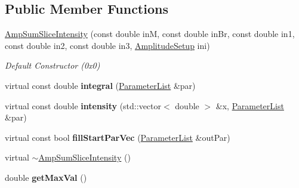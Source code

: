 \subsection*{Public Member Functions}
\begin{DoxyCompactItemize}
\item 
\hypertarget{class_amp_sum_slice_intensity_a84184310702a57fe213ef21d341f5c4e}{\hyperlink{class_amp_sum_slice_intensity_a84184310702a57fe213ef21d341f5c4e}{Amp\-Sum\-Slice\-Intensity} (const double in\-M, const double in\-Br, const double in1, const double in2, const double in3, \hyperlink{class_amplitude_setup}{Amplitude\-Setup} ini)}\label{class_amp_sum_slice_intensity_a84184310702a57fe213ef21d341f5c4e}

\begin{DoxyCompactList}\small\item\em Default Constructor (0x0) \end{DoxyCompactList}\item 
\hypertarget{class_amp_sum_slice_intensity_aeef9bdb403caa91ca4bf8615627ca6fc}{virtual const double {\bfseries integral} (\hyperlink{class_parameter_list}{Parameter\-List} \&par)}\label{class_amp_sum_slice_intensity_aeef9bdb403caa91ca4bf8615627ca6fc}

\item 
\hypertarget{class_amp_sum_slice_intensity_a845d93e9216f2af4057715ce879d3989}{virtual const double {\bfseries intensity} (std\-::vector$<$ double $>$ \&x, \hyperlink{class_parameter_list}{Parameter\-List} \&par)}\label{class_amp_sum_slice_intensity_a845d93e9216f2af4057715ce879d3989}

\item 
\hypertarget{class_amp_sum_slice_intensity_ac9eda7d89099198806b0acd365acf884}{virtual const bool {\bfseries fill\-Start\-Par\-Vec} (\hyperlink{class_parameter_list}{Parameter\-List} \&out\-Par)}\label{class_amp_sum_slice_intensity_ac9eda7d89099198806b0acd365acf884}

\item 
virtual \hyperlink{class_amp_sum_slice_intensity_aec60ef699833a82fd1d3705c0d889a42}{$\sim$\-Amp\-Sum\-Slice\-Intensity} ()
\item 
\hypertarget{class_amp_sum_slice_intensity_a8badde30f0af858cf9bbbe74b3001813}{double {\bfseries get\-Max\-Val} ()}\label{class_amp_sum_slice_intensity_a8badde30f0af858cf9bbbe74b3001813}

\end{DoxyCompactItemize}
